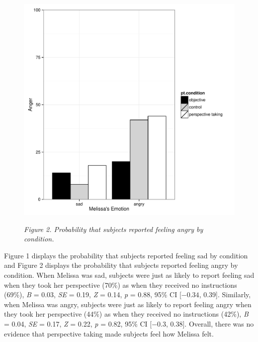 \documentclass[man,a4paper,noextraspace,apacite]{apa6}\usepackage[]{graphicx}\usepackage[]{color}
\makeatletter
\def\maxwidth{ %
  \ifdim\Gin@nat@width>\linewidth
    \linewidth
  \else
    \Gin@nat@width
  \fi
}
\newenvironment{knitrout}{}{} %
\makeatother
\begin{document}
\begin{figure}
\begin{knitrout}
\color{fgcolor}
\includegraphics[width=\maxwidth]{figure/Figure2Angry-1} 

\end{knitrout}
\textit{Figure 2. Probability that subjects reported feeling angry by condition.}
\end{figure}



Figure 1 displays the probability that subjects reported feeling sad by condition and Figure 2 displays the probability that subjects reported feeling angry by condition. When Melissa was sad, subjects were just as likely to report feeling sad when they took her perspective (70\%) as when they received no instructions (69\%), \textit{B} = 0.03, \textit{SE} = 0.19, \textit{Z} = 0.14, \textit{p} = 0.88, 95\% CI [\ensuremath{-0.34}, 0.39]. Similarly, when Melissa was angry, subjects were just as likely to report feeling angry when they took her perspective (44\%) as when they received no instructions (42\%), \textit{B} = 0.04, \textit{SE} = 0.17, \textit{Z} = 0.22, \textit{p} = 0.82, 95\% CI [\ensuremath{-0.3}, 0.38]. Overall, there was no evidence that perspective taking made subjects feel how Melissa felt.
\end{document}
